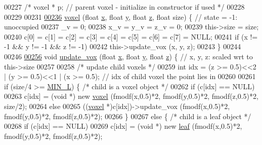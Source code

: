 \begin{DoxyCode}
00227     \textcolor{comment}{/* voxel * p; // parent voxel - initialize in constructor if used */}
00228 
00229 
00231 
\hypertarget{Voxel_8hpp_source.tex_l00236}{}\hyperlink{classvoxel_a77f20a6fddec8f3aa3c719c3dc609948}{00236}     \hyperlink{classvoxel_a77f20a6fddec8f3aa3c719c3dc609948}{voxel} (\textcolor{keywordtype}{float} \hyperlink{classquaternion_acdcda48f9dd7ff35873aae38fa33ab78}{x}, \textcolor{keywordtype}{float} \hyperlink{classquaternion_a48e3d1fbf5e12eb54985c32b45dd8303}{y}, \textcolor{keywordtype}{float} \hyperlink{classquaternion_a538598007238d399f79ddcecd39ef5cf}{z}, \textcolor{keywordtype}{float} size) \{ \textcolor{comment}{// state = -1: unoccupied}
00237         \_v = 0;
00238         x\_v = y\_v = z\_v = 0;
00239         this->size = size;
00240         c[0] = c[1] = c[2] = c[3] = c[4] = c[5] = c[6] = c[7] = NULL;
00241         \textcolor{keywordflow}{if} (x != -1 && y != -1 && z != -1)
00242             this->update\_vox (x, y, z);
00243     \}
00244 
00246 
\hypertarget{Voxel_8hpp_source.tex_l00256}{}\hyperlink{classvoxel_ae550590cfe0d4c3d0e78cbf0cfa3390f}{00256}     \textcolor{keywordtype}{void} \hyperlink{classvoxel_ae550590cfe0d4c3d0e78cbf0cfa3390f}{update\_vox} (\textcolor{keywordtype}{float} \hyperlink{classquaternion_acdcda48f9dd7ff35873aae38fa33ab78}{x}, \textcolor{keywordtype}{float} \hyperlink{classquaternion_a48e3d1fbf5e12eb54985c32b45dd8303}{y}, \textcolor{keywordtype}{float} \hyperlink{classquaternion_a538598007238d399f79ddcecd39ef5cf}{z}) \{ \textcolor{comment}{// x, y, z: scaled wrt to this->size}
00257 
00258         \textcolor{comment}{/* update child voxels */}
00259         \textcolor{keywordtype}{int} idx = (z >= 0.5)<<2 | (y >= 0.5)<<1 | (x >= 0.5); \textcolor{comment}{// idx of child voxel the point lies in}
00260 
00261         \textcolor{keywordflow}{if} (size/4 >= \hyperlink{Voxel_8hpp_a29d8f4bb35f9fa62e1d680bc6ab1f4f1}{MIN\_L}) \{ \textcolor{comment}{/* child is a voxel object */}
00262             \textcolor{keywordflow}{if} (c[idx] == NULL)
00263                 c[idx] = (\textcolor{keywordtype}{void} *) \textcolor{keyword}{new} \hyperlink{classvoxel}{voxel} (fmodf(x,0.5)*2, fmodf(y,0.5)*2, fmodf(z,0.5)*2, size/2);
00264             \textcolor{keywordflow}{else}
00265                 ((\hyperlink{classvoxel}{voxel} *)c[idx])->update\_vox (fmodf(x,0.5)*2, fmodf(y,0.5)*2, fmodf(z,0.5)*2);
00266         \}
00267         \textcolor{keywordflow}{else} \{ \textcolor{comment}{/* child is a leaf object */}
00268             \textcolor{keywordflow}{if} (c[idx] == NULL)
00269                 c[idx] = (\textcolor{keywordtype}{void} *) \textcolor{keyword}{new} \hyperlink{classleaf}{leaf} (fmodf(x,0.5)*2, fmodf(y,0.5)*2, fmodf(z,0.5)*2);

\end{DoxyCode}
